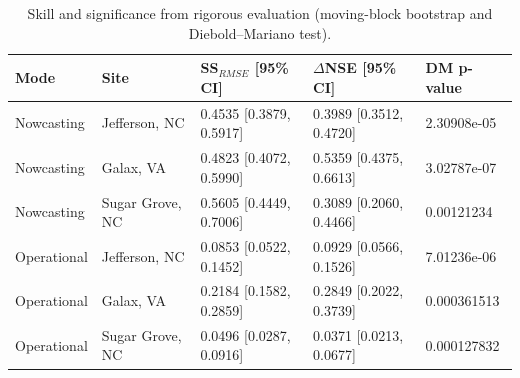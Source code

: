 \begin{table}
\centering
\caption{Skill and significance from rigorous evaluation (moving-block bootstrap and Diebold--Mariano test).}
\small
\begin{tabular}{ll l l l}
\toprule
\textbf{Mode} & \textbf{Site} & \textbf{SS$_{RMSE}$ [95\% CI]} & \textbf{$\Delta$NSE [95\% CI]} & \textbf{DM p-value} \\
\midrule
Nowcasting & Jefferson, NC & 0.4535 [0.3879, 0.5917] & 0.3989 [0.3512, 0.4720] & 2.30908e-05 \\
Nowcasting & Galax, VA & 0.4823 [0.4072, 0.5990] & 0.5359 [0.4375, 0.6613] & 3.02787e-07 \\
Nowcasting & Sugar Grove, NC & 0.5605 [0.4449, 0.7006] & 0.3089 [0.2060, 0.4466] & 0.00121234 \\
Operational & Jefferson, NC & 0.0853 [0.0522, 0.1452] & 0.0929 [0.0566, 0.1526] & 7.01236e-06 \\
Operational & Galax, VA & 0.2184 [0.1582, 0.2859] & 0.2849 [0.2022, 0.3739] & 0.000361513 \\
Operational & Sugar Grove, NC & 0.0496 [0.0287, 0.0916] & 0.0371 [0.0213, 0.0677] & 0.000127832 \\
\bottomrule
\end{tabular}
\label{tab:significance}
\end{table}
